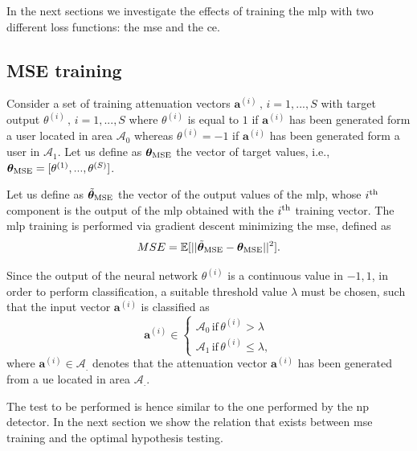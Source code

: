 \documentclass[draftcls,onecolumn,12pt]{IEEEtran}
\begin{document}
In the next sections we investigate the effects of training the \ac{mlp} with two different loss functions: the \ac{mse} and the \ac{ce}.

\subsection{ MSE training}
Consider a set of training attenuation vectors $\bm{a}^{(i)} \, , \, i=1,...,S$ with target output $\theta^{(i)} \, , \, i=1,...,S $ where $\theta^{(i)}$ is equal to $1$ if $\bm{a}^{(i)}$ has been generated form a user located in area $\mathcal{A}_0$ whereas $\theta^{(i)}=-1$ if $\bm{a}^{(i)}$ has been generated form a user in $\mathcal{A}_1$. Let us define as $\bm{\theta}_{\rm MSE}$ the vector of target values, i.e., $\bm{\theta}_{\rm MSE}=[\theta^{(1)},...,\theta^{(S)}]$.

Let us define as $\tilde{\bm{\theta}}_{\rm MSE}$ the vector of the output values of the \ac{mlp}, whose $i^{\rm th}$ component is the output of the \ac{mlp} obtained with the $i^{\rm th}$ training vector. The \ac{mlp} training is performed via gradient descent minimizing the \ac{mse}, defined as
\begin{equation}
MSE = \mathbb{E}[||\tilde{\bm{\theta}}_{\rm MSE}-\bm{\theta}_{\rm MSE}||^2].
\end{equation}

Since the output of the neural network $\theta^{(i)}$ is a continuous value in ${-1,1}$, in order to perform classification, a suitable threshold value $\lambda$ must be chosen, such that the input vector $\bm{a}^{(i)}$ is classified as
\begin{equation}
\bm{a}^{(i)} \in
\begin{cases}
\mathcal{A}_0 \, \text{if} \, \theta^{(i)} > \lambda \\
\mathcal{A}_1 \, \text{if} \, \theta^{(i)} \le \lambda, 
\end{cases}
\end{equation}
where $\bm{a}^{(i)} \in \mathcal{A}_.$ denotes that the attenuation vector $\bm{a}^{(i)}$ has been generated from a \ac{ue} located in area $\mathcal{A}_.$.

The test to be performed is hence similar to the one performed by the \ac{np} detector. In the next section we show the relation that exists between \ac{mse} training and the optimal hypothesis testing. 
\end{document}
